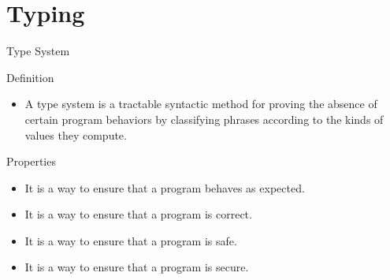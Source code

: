 \section{Typing}
\begin{frame}{Type System}
    \begin{block}{Definition}
        \begin{itemize}
            \item A type system is a tractable syntactic method for proving the absence of certain program behaviors by classifying phrases according to the kinds of values they compute.
        \end{itemize}
    \end{block}
    \begin{block}{Properties}
        \begin{itemize}
            \item It is a way to ensure that a program behaves as expected.
            \item It is a way to ensure that a program is correct.
            \item It is a way to ensure that a program is safe.
            \item It is a way to ensure that a program is secure.
        \end{itemize}
    \end{block}
\end{frame}